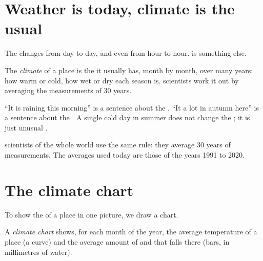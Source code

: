 \section{Weather is today, climate is the usual}

The  changes from day to day, and even from hour to hour. 
is something else.

\begin{definition}[Climate]\label{def:g5:weather-and-climate:climate}
The \emph{climate} of a place is the  it usually
has, month by month, over many years: how warm or cold, how wet or dry
each season is.  scientists work it out by averaging the
measurements of 30 years.
\end{definition}

``It is raining this morning'' is a sentence about the . ``It 
a lot in autumn here'' is a sentence about the . A single cold day
in summer does not change the ; it is just unusual .

 scientists of the whole world use the same rule: they average
30 years of measurements. The averages used today are those of the years
1991 to 2020.

\section{The climate chart}

To show the  of a place in one picture, we draw a chart.

\begin{definition}\label{def:g5:weather-and-climate:climate-chart}
A \emph{climate chart} shows, for each month of the
year, the average temperature of a place (a curve) and the average amount
of  and  that falls there (bars, in millimetres of water).
\end{definition}

